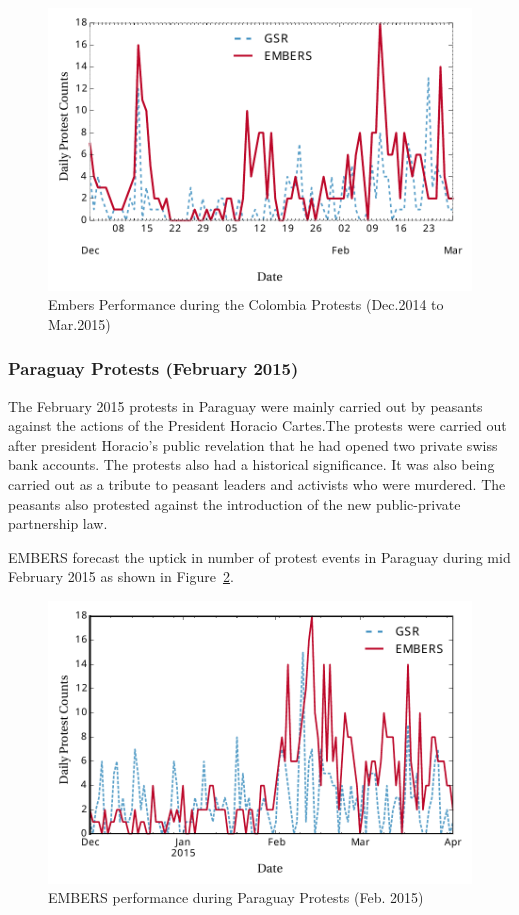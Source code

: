 \documentclass[11pt,a4paper,extrafontsizes,oneside]{article}
\begin{document}
\begin{figure} \centering
\includegraphics[width=.8\columnwidth]{colombiaDec15}
\caption{Embers Performance during the Colombia Protests (Dec.2014 to Mar.2015)}
\label{fig:colombiaDec14}
\end{figure}

\subsubsection*{Paraguay Protests (February 2015)}
The February 2015 protests in Paraguay were mainly carried out by peasants
against the actions of the President Horacio Cartes.The protests were carried out after
president Horacio's public revelation that he had opened two private swiss bank accounts.
The protests also had a historical significance. It was also being carried out as a tribute
to peasant leaders and activists who were murdered. The peasants also protested
against the introduction of the new public-private partnership law.

EMBERS forecast the uptick in number of protest events in Paraguay during mid
February 2015 as shown in Figure~\ref{fig:paraguay15}.

\begin{figure} \centering
\includegraphics[width=.8\columnwidth]{paraguayFeb15}
\caption{EMBERS performance during Paraguay Protests (Feb. 2015)}
\label{fig:paraguay15}
\end{figure}
\end{document}
